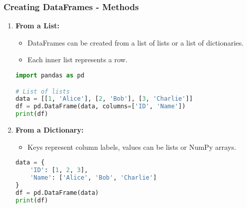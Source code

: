 \documentclass[aspectratio=169]{beamer}
\begin{document}
\begin{frame}[fragile]
    \frametitle{Creating DataFrames - Methods}
    \begin{enumerate}
        \item \textbf{From a List:}
            \begin{itemize}
                \item DataFrames can be created from a list of lists or a list of dictionaries.
                \item Each inner list represents a row.
            \end{itemize}
            \begin{lstlisting}[language=Python]
import pandas as pd

# List of lists
data = [[1, 'Alice'], [2, 'Bob'], [3, 'Charlie']]
df = pd.DataFrame(data, columns=['ID', 'Name'])
print(df)
            \end{lstlisting}

        \item \textbf{From a Dictionary:}
            \begin{itemize}
                \item Keys represent column labels, values can be lists or NumPy arrays.
            \end{itemize}
            \begin{lstlisting}[language=Python]
data = {
    'ID': [1, 2, 3],
    'Name': ['Alice', 'Bob', 'Charlie']
}
df = pd.DataFrame(data)
print(df)
            \end{lstlisting}
    \end{enumerate}
\end{frame}
\end{document}
